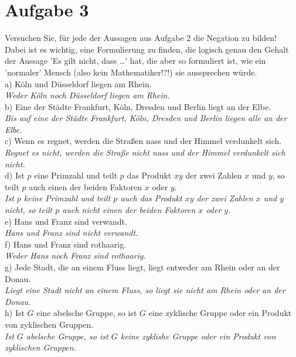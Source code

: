 \section*{Aufgabe 3}

Versuchen Sie, für jede der Aussagen aus Aufgabe 2 die Negation zu bilden!\\

Dabei ist es wichtig, eine Formulierung zu finden, die logisch genau den Gehalt der Aussage 'Es gilt nicht, dass \dots ' hat, die aber so formuliert ist, wie ein 'normaler' Mensch (also kein Mathematiker!?!) sie aussprechen würde.\\

a) Köln und Düsseldorf liegen am Rhein.\\

\textit{Weder Köln noch Düsseldorf liegen am Rhein.}\\

b) Eine der Städte Frankfurt, Köln, Dresden und Berlin liegt an der Elbe.\\

\textit{Bis auf eine der Städte Frankfurt, Köln, Dresden und Berlin liegen alle an der Elbe.}\\

c) Wenn es regnet, werden die Straßen nass und der Himmel verdunkelt sich.\\

\textit{Regnet es nicht, werden die Straße nicht nass und der Himmel verdunkelt sich nicht.}\\

d) Ist $p$ eine Primzahl und teilt $p$ das Produkt $xy$ der zwei Zahlen $x$ und $y$, so teilt $p$ auch einen der beiden Faktoren $x$ oder $y$.\\

\textit{Ist $p$ keine Primzahl und teilt $p$ auch das Produkt $xy$ der zwei Zahlen $x$ und $y$ nicht, so teilt $p$ auch nicht einen der beiden Faktoren $x$ oder $y$.}\\

e) Hans und Franz sind verwandt.\\

\textit{Hans und Franz sind nicht verwandt.}\\

f) Hans und Franz sind rothaarig.\\

\textit{Weder Hans noch Franz sind rothaarig.}\\

g) Jede Stadt, die an einem Fluss liegt, liegt entweder am Rhein oder an der Donau.\\

\textit{Liegt eine Stadt nicht an einem Fluss, so liegt sie nicht am Rhein oder an der Donau.}\\

h) Ist $G$ eine abelsche Gruppe, so ist $G$ eine zyklische Gruppe oder ein Produkt von zyklischen Gruppen.\\

\textit{Ist $G$ abelsche Gruppe, so ist $G$ keine zyklishe Gruppe oder ein Produkt von zyklischen Gruppen.}

